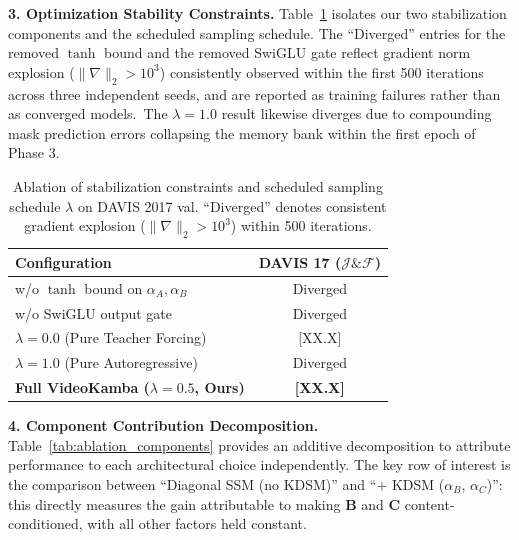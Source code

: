 \documentclass[sigconf]{acmart}
\begin{document}
\textbf{3. Optimization Stability Constraints.}
Table~\ref{tab:ablation_stability} isolates our two stabilization components and the scheduled sampling schedule. The ``Diverged'' entries for the removed $\tanh$ bound and the removed SwiGLU gate reflect gradient norm explosion ($\|\nabla\|_2 > 10^3$) consistently observed within the first 500 iterations across three independent seeds, and are reported as training failures rather than as converged models.\footnotemark\, The $\lambda=1.0$ result likewise diverges due to compounding mask prediction errors collapsing the memory bank within the first epoch of Phase 3.


\begin{table}[h]
\centering
\caption{Ablation of stabilization constraints and scheduled sampling schedule $\lambda$ on DAVIS 2017 val. ``Diverged'' denotes consistent gradient explosion ($\|\nabla\|_2 > 10^3$) within 500 iterations.}
\label{tab:ablation_stability}
\begin{tabular}{lc}
\toprule
\textbf{Configuration} & \textbf{DAVIS 17 ($\mathcal{J}\&\mathcal{F}$)} \\
\midrule
w/o $\tanh$ bound on $\alpha_A, \alpha_B$ & Diverged \\
w/o SwiGLU output gate & Diverged \\
$\lambda = 0.0$ (Pure Teacher Forcing) & [XX.X] \\
$\lambda = 1.0$ (Pure Autoregressive) & Diverged \\
\textbf{Full VideoKamba ($\lambda{=}0.5$, Ours)} & \textbf{[XX.X]} \\
\bottomrule
\end{tabular}
\end{table}

\textbf{4. Component Contribution Decomposition.}
Table~\ref{tab:ablation_components} provides an additive decomposition to attribute performance to each architectural choice independently. The key row of interest is the comparison between ``Diagonal SSM (no KDSM)'' and ``+ KDSM ($\alpha_B$, $\alpha_C$)'': this directly measures the gain attributable to making $\mathbf{B}$ and $\mathbf{C}$ content-conditioned, with all other factors held constant.
\end{document}
